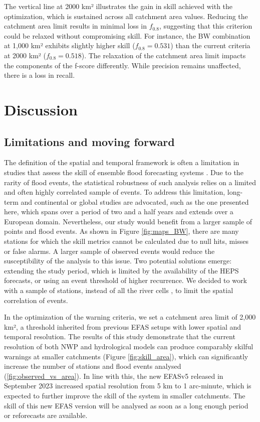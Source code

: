 \documentclass{ametsocV6.1}
\begin{document}
The vertical line at 2000 km² illustrates the gain in skill achieved with the optimization, which is sustained across all catchment area values. Reducing the catchment area limit results in minimal loss in $f_{0.8}$, suggesting that this criterion could be relaxed without compromising skill. For instance, the BW combination at 1,000 km²  exhibits slightly higher skill ($f_{0.8}=0.531$) than the current criteria at 2000 km² ($f_{0.8}=0.518$). The relaxation of the catchment area limit impacts the components of the f-score differently. While precision remains unaffected, there is a loss in recall.

\section{Discussion}
\label{sec:discussion}

\subsection{Limitations and moving forward}
\label{disc:limitations}

The definition of the spatial and temporal framework is often a limitation in studies that assess the skill of ensemble flood forecasting systems \citep{Pappenberger2008a, Cloke2009}. Due to the rarity of flood events, the statistical robustness of such analysis relies on a limited and often highly correlated sample of events. To address this limitation, long-term and continental or global studies are advocated, such as the one presented here, which spans over a period of two and a half years and extends over a European domain. Nevertheless, our study would benefit from a larger sample of points and flood events. As shown in Figure \ref{fig:maps_BW}, there are many stations for which the skill metrics cannot be calculated due to null hits, misses or false alarms. A larger sample of observed events would reduce the susceptibility of the analysis to this issue. Two potential solutions emerge: extending the study period, which is limited by the availability of the HEPS forecasts, or using an event threshold of higher recurrence. We decided to work with a sample of stations, instead of all the river cells \citep{Bartholmes2009}, to limit the spatial correlation of events.

In the optimization of the warning criteria, we set a catchment area limit of 2,000 km², a threshold inherited from previous EFAS setups with lower spatial and temporal resolution. The results of this study  demonstrate that the current resolution of both NWP and hydrological models can produce comparably skilful warnings at smaller catchments (Figure \ref{fig:skill_area}), which can significantly increase the number of stations and flood events analysed (\ref{fig:observed_vs_area}). In line with this, the new EFASv5 \citep{EFASv5.0} released in September 2023 increased spatial resolution from 5 km to 1 arc-minute, which is expected to further improve the skill of the system in smaller catchments. The skill of this new EFAS version will be analysed as soon as a long enough period or reforecasts are available.
\end{document}
